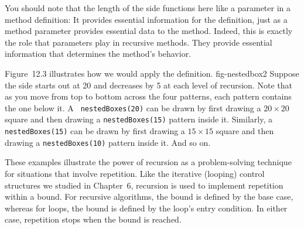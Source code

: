 You should note that the length of the side functions here like a
parameter in a method definition: It provides essential information
for the definition, just as a method parameter provides essential data
to the method.  Indeed, this is exactly the role that parameters play
in recursive methods.  They provide essential information that
determines the method's behavior.

\pagebreak
Figure~12.3 illustrates how we would apply the definition.
{fig-nestedbox2}
Suppose the side starts out at 20 and decreases by 5 at each level of
recursion.  Note that as you move from top to bottom across the four
patterns, each pattern contains the one below it.  A {\tt
nestedBoxes(20)} can be drawn by first drawing a $20 \times 20$ square
and then drawing a {\tt nestedBoxes(15)} pattern inside it.
Similarly, a {\tt nestedBoxes(15)} can be drawn by first drawing a $15
\times 15$ square and then drawing a {\tt nestedBoxes(10)} pattern
inside it.  And so on.

These examples illustrate the power of recursion as a
problem-solving technique for situations that involve repetition.
Like the iterative (looping) control structures we studied in
Chapter~6, recursion is used to implement repetition
within a bound.   For recursive algorithms, the bound is defined by the
base case, whereas for loops, the bound is defined by the loop's entry
condition.   In either case, repetition stops when the bound is
reached.

